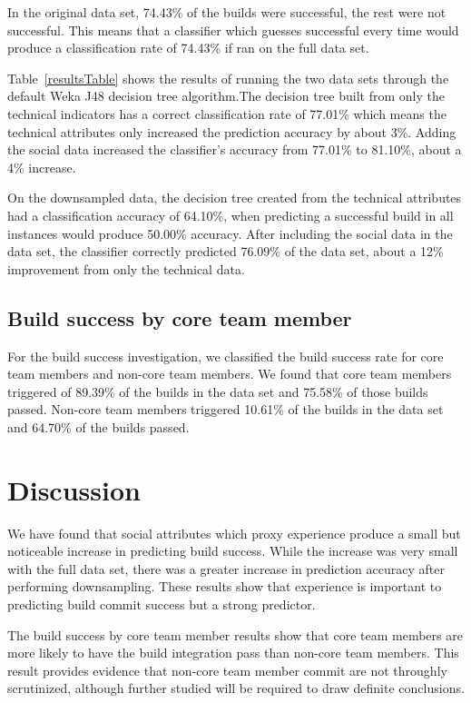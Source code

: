 \documentclass[10pt, conference]{IEEEtran}
\begin{document}
 
In the original data set, 74.43\% of the builds were successful, the rest were not
successful.  This means that a classifier which guesses successful every time
would produce a classification rate of 74.43\% if ran on the full data set. 

Table~\ref{resultsTable} shows the results of running the two data sets through the
default Weka J48 decision tree algorithm.The decision tree built from
only the technical indicators has a correct classification rate of 77.01\% which
means the technical attributes only increased the prediction accuracy by about 3\%.
Adding the social data increased the classifier's accuracy from 77.01\% to
81.10\%, about a 4\% increase.  

On the downsampled data, the decision tree created from the technical attributes
had a classification accuracy of 64.10\%, when predicting a successful build in
all instances would produce 50.00\% accuracy.  After including the social data
in the data set, the classifier correctly predicted 76.09\% of the data set,
about a 12\% improvement from only the technical data.


\subsection{Build success by core team member}

For the build success investigation, we classified the build success rate for
core team members and non-core team members.  We found that core team members
triggered of 89.39\% of the builds in the data set and 75.58\% of those builds
passed.  Non-core team members triggered 10.61\% of the builds in the data set
and 64.70\% of the builds passed.


\section{Discussion}
We have found that social attributes which proxy experience produce a small but
noticeable increase in predicting build success.  While the increase was very
small with the full data set, there was a greater increase in prediction
accuracy after performing downsampling.  These results show that experience is
important to predicting build commit success but a strong predictor.

The build success by core team member results show that core team members are
more likely to have the build integration pass than non-core team members.  This
result provides evidence that non-core team member commit are not throughly
scrutinized, although further studied will be required to draw definite
conclusions.
\end{document}
